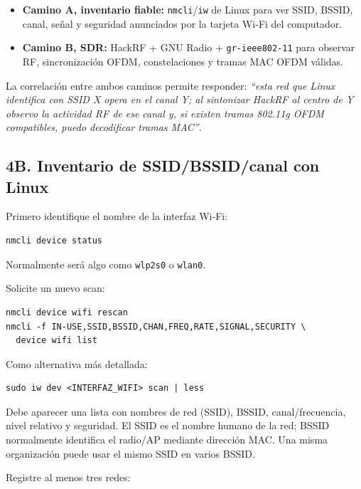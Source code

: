 \begin{itemize}
    \item \textbf{Camino A, inventario fiable:} \texttt{nmcli}/\texttt{iw} de Linux para ver SSID, BSSID, canal, señal y seguridad anunciados por la tarjeta Wi-Fi del computador.
    \item \textbf{Camino B, SDR:} HackRF + GNU Radio + \texttt{gr-ieee802-11} para observar RF, sincronización OFDM, constelaciones y tramas MAC OFDM válidas.
\end{itemize}

La correlación entre ambos caminos permite responder: \emph{``esta red que Linux identifica con SSID X opera en el canal Y; al sintonizar HackRF al centro de Y observo la actividad RF de ese canal y, si existen tramas 802.11g OFDM compatibles, puedo decodificar tramas MAC''}.

\subsection{4B. Inventario de SSID/BSSID/canal con Linux}

Primero identifique el nombre de la interfaz Wi-Fi:

\begin{lstlisting}
nmcli device status
\end{lstlisting}

Normalmente será algo como \texttt{wlp2s0} o \texttt{wlan0}.

Solicite un nuevo scan:

\begin{lstlisting}
nmcli device wifi rescan
nmcli -f IN-USE,SSID,BSSID,CHAN,FREQ,RATE,SIGNAL,SECURITY \
  device wifi list
\end{lstlisting}

Como alternativa más detallada:

\begin{lstlisting}
sudo iw dev <INTERFAZ_WIFI> scan | less
\end{lstlisting}

\begin{esperado}
Debe aparecer una lista con nombres de red (SSID), BSSID, canal/frecuencia, nivel relativo y seguridad. El SSID es el nombre humano de la red; BSSID normalmente identifica el radio/AP mediante dirección MAC. Una misma organización puede usar el mismo SSID en varios BSSID.
\end{esperado}

Registre al menos tres redes:

